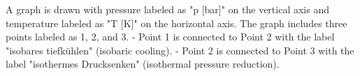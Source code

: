 A graph is drawn with pressure labeled as "p [bar]" on the vertical axis and temperature labeled as "T [K]" on the horizontal axis. The graph includes three points labeled as 1, 2, and 3.  
- Point 1 is connected to Point 2 with the label "isobares tiefkühlen" (isobaric cooling).  
- Point 2 is connected to Point 3 with the label "isothermes Drucksenken" (isothermal pressure reduction).